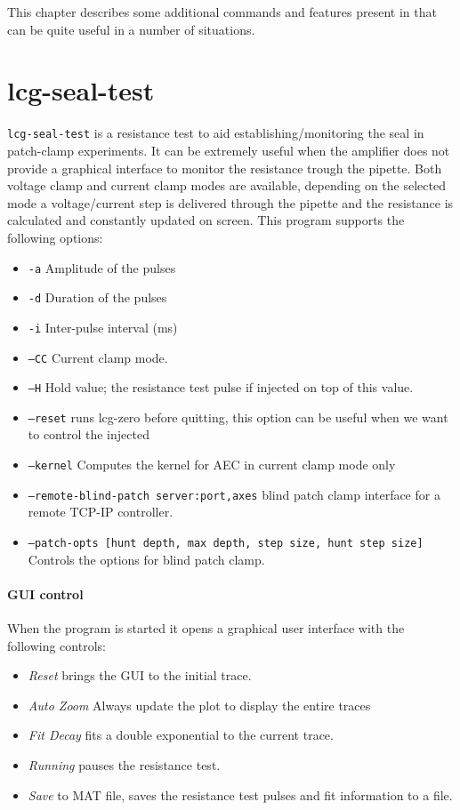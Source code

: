 This chapter describes some additional commands and features present
in \progname that can be quite useful in a number of situations.

\section{lcg-seal-test} \label{sec:seal_test}

\texttt{lcg-seal-test} is a resistance test to aid establishing/monitoring the seal in patch-clamp experiments. It can be extremely useful when the amplifier does not provide a graphical interface to monitor the resistance trough the pipette. Both voltage clamp and current clamp modes are available, depending on the selected mode a voltage/current step is delivered through the pipette and the resistance is calculated and constantly updated on screen. 
This program supports the following options:

\begin{itemize}
\item{\texttt{-a}} Amplitude of the pulses 
\item{\texttt{-d}} Duration of the pulses
\item{\texttt{-i}} Inter-pulse interval (ms)
\item{\texttt{--CC}} Current clamp mode.
\item{\texttt{--H}} Hold value; the resistance test pulse if injected on top of this value.
\item{\texttt{--reset}} runs lcg-zero before quitting, this option can be useful when we want to control the injected 
\item{\texttt{--kernel}} Computes the kernel for AEC in current clamp mode only
\item{\texttt{--remote-blind-patch server:port,axes}} blind patch clamp interface for a remote TCP-IP controller.
\item{\texttt{--patch-opts [hunt depth, max depth, step size, hunt step size]}}  Controls the options for blind patch clamp.
\end{itemize}

\paragraph{GUI control} When the program is started it opens a graphical user interface with the following controls:
\begin{itemize}
\item{\emph{Reset}} brings the GUI to the initial trace.
\item{\emph{Auto Zoom}} Always update the plot to display the entire traces
\item{\emph{Fit Decay}} fits a double exponential to the current trace.
\item{\emph{Running}} pauses the resistance test.
\item{\emph{Save}} to MAT file, saves the resistance test pulses and fit information to a file.
\end{itemize}

